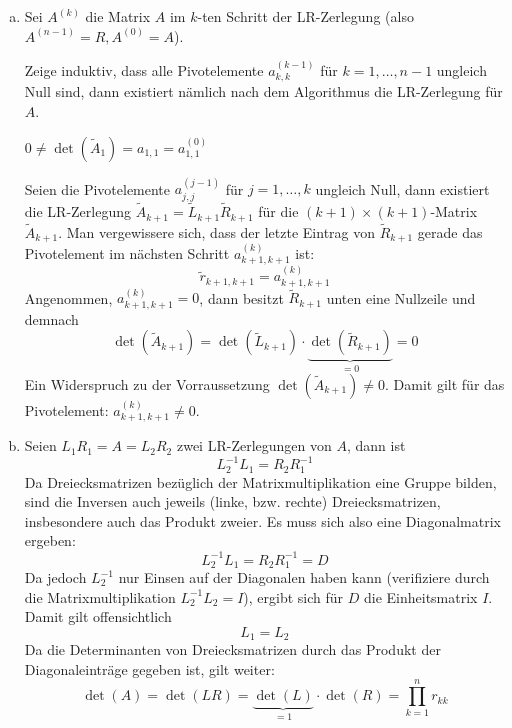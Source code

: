 \documentclass[a4paper]{scrartcl}
\begin{document}
\begin{aufgabe}
	\begin{enumerate}[a)]
		\item
			Sei $A^{(k)}$ die Matrix $A$ im $k$-ten Schritt der LR-Zerlegung (also $A^{(n-1)}=R, A^{(0)}=A$).

			Zeige induktiv, dass alle Pivotelemente $a_{k,k}^{(k-1)}$ für $k=1,\dotsc,n-1$ ungleich Null sind, dann existiert nämlich nach dem Algorithmus die LR-Zerlegung für $A$.

			\begin{seg}[Induktionsanfang ($n=1$)]
				$\displaystyle 0 \neq \det(\tilde A_1) = a_{1,1} = a_{1,1}^{(0)}$
			\end{seg}
			\begin{seg}[Induktionsschritt]
				Seien die Pivotelemente $a_{j,j}^{(j-1)}$ für $j=1,\dotsc,k$ ungleich Null, dann existiert die LR-Zerlegung $\tilde A_{k+1} = \tilde L_{k+1} \tilde R_{k+1}$ für die $(k+1)\times (k+1)$-Matrix $\tilde A_{k+1}$.
				Man vergewissere sich, dass der letzte Eintrag von $\tilde R_{k+1}$ gerade das Pivotelement im nächsten Schritt $a_{k+1,k+1}^{(k)}$ ist:
				\[
					\tilde r_{k+1,k+1} = a^{(k)}_{k+1,k+1}
				\]
				Angenommen, $a_{k+1,k+1}^{(k)} = 0$, dann besitzt $\tilde R_{k+1}$ unten eine Nullzeile und demnach
				\[
					\det(\tilde A_{k+1}) = \det(\tilde L_{k+1}) \cdot \underbrace{\det(\tilde R_{k+1})}_{=0} = 0
				\]
				Ein Widerspruch zu der Vorraussetzung $\det(\tilde A_{k+1}) \neq 0$.
				Damit gilt für das Pivotelement: $a_{k+1,k+1}^{(k)} \neq 0$.
			\end{seg}
		\item
			Seien $L_1R_1 = A = L_2R_2$ zwei LR-Zerlegungen von $A$, dann ist
			\[
				L_2^{-1}L_1 = R_2R_1^{-1}
			\]
			Da Dreiecksmatrizen bezüglich der Matrixmultiplikation eine Gruppe bilden, sind die Inversen auch jeweils (linke, bzw. rechte) Dreiecksmatrizen, insbesondere auch das Produkt zweier.
			Es muss sich also eine Diagonalmatrix ergeben: 
			\[
				L_2^{-1}L_1 = R_2R_1^{-1} = D
			\]
			Da jedoch $L_2^{-1}$ nur Einsen auf der Diagonalen haben kann (verifiziere durch die Matrixmultiplikation $L_2^{-1}L_2 = I$), ergibt sich für $D$ die Einheitsmatrix $I$.
			Damit gilt offensichtlich
			\[
				L_1 = L_2
			\]
			Da die Determinanten von Dreiecksmatrizen durch das Produkt der Diagonaleinträge gegeben ist, gilt weiter:
			\[
				\det(A) = \det(LR) = \underbrace{\det(L)}_{=1} \cdot \det(R) = \prod_{k=1}^n r_{kk}
			\]
	\end{enumerate}
\end{aufgabe}
\end{document}
